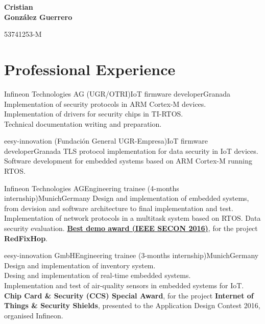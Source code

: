\documentclass[11pt,a4paper,sans,spanish]{moderncv}
\begin{document}
\begin{minipage}[c]{\textwidth-100pt-0.5em}
    \begin{flushright}
        \textbf{\Huge{Cristian\\\vspace{4pt}González Guerrero}}

        \vspace{4pt}
        \small{53741253-M}
    \end{flushright}
\end{minipage}
\vspace{-5em}

\makecvtitle

\section{Professional Experience}

{Infineon Technologies AG (UGR/OTRI)}{IoT firmware developer}{Granada}{}
{Implementation of security protocols in ARM Cortex-M devices.\\
Implementation of drivers for security chips in TI-RTOS.\\
Technical documentation writing and preparation.
}

{eesy-innovation (Fundación General UGR-Empresa)}{IoT firmware developer}{Granada}{}
{TLS protocol implementation for data security in IoT devices.\\
Software development for embedded systems based on ARM Cortex-M running RTOS.\\
}

{Infineon Technologies AG}{Engineering trainee (4-months internship)}{Munich}{Germany}
{Design and implementation of embedded systems, from devision and software architecture to final implementation and test.\\
Implementation of network protocols in a multitask system based on RTOS.
Data security evaluation.
\href{http://secon2016.ieee-secon.org/content/demos-session}{\textbf{Best demo award (IEEE SECON 2016)}}, for the project \textbf{RedFixHop}.
}

{eesy-innovation GmbH}{Engineering trainee (3-months internship)}{Munich}{Germany}
{Design and implementation of inventory system.\\
Desing and implementation of real-time embedded systems.\\
Implementation and test of air-quality sensors in embedded systems for IoT.\\
\textbf{Chip Card \& Security (CCS) Special Award}, for the project \textbf{Internet of Things \& Security Shields}, presented to the Application Design Contest 2016, organised Infineon.}
\end{document}
